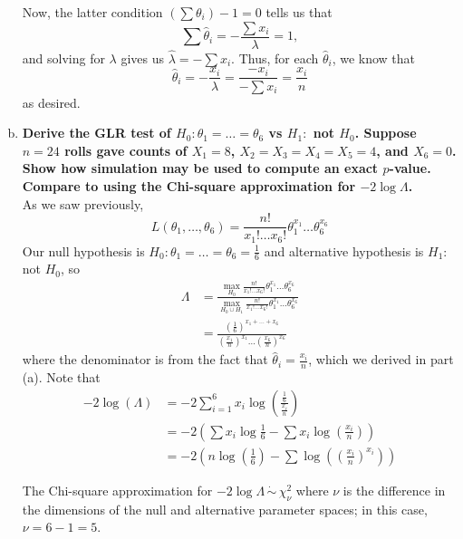 \begin{enumerate}[a)]
    Now, the latter condition $\left(\sum \theta_i \right) - 1 = 0$ tells us that
    \[
        \sum \hat{\theta}_i = - \frac{\sum x_i}{\lambda} = 1,
    \]
    and solving for $\lambda$ gives us $\hat{\lambda} = - \sum x_i$. Thus, for each $\hat{\theta}_i$, we know that
    \[
        \hat{\theta}_i = -\frac{x_i}{\lambda} = \frac{-x_i}{- \sum x_i} = \frac{x_i}{n}
    \]    
    as desired. 

    \item \textbf{Derive the GLR test of $H_0 \colon \theta_1 = \dots = \theta_6$ vs $H_1 \colon$ not $H_0$. Suppose $n=24$ rolls gave counts of $X_1 = 8$, $X_2 = X_3 = X_4 = X_5 = 4$, and $X_6 =0$. Show how simulation may be used to compute an exact $p$-value. Compare to using the Chi-square approximation for $-2\log \Lambda$.} \\
    
     As we saw previously, 
    \[
        L(\theta_1, \dots, \theta_6) = \frac{n!}{x_1! \dots x_6!}\theta_1^{x_1} \dots \theta_6^{x_6}
    \]
    Our null hypothesis is $H_0\colon \theta_1 = \dots = \theta_6 = \frac{1}{6}$ and alternative hypothesis is $H_1\colon$ not $H_0$, so
    \begin{align*}
        \Lambda &= \frac{\max\limits_{H_0} \frac{n!}{x_1! \dots x_6!}\theta_1^{x_1} \dots \theta_6^{x_6}}{\max\limits_{H_0 \cup H_1} \frac{n!}{x_1! \dots x_6!}\theta_1^{x_1} \dots \theta_6^{x_6}} \\
        &= \frac{\left( \frac{1}{6} \right)^{x_1 + \dots + x_6} }{\left( \frac{x_1}{n} \right)^{x_1} \dots \left( \frac{x_6}{n} \right)^{x_6} }
    \end{align*}
    where the denominator is from the fact that $\hat{\theta}_i = \frac{x_i}{n}$, which we derived in part (a). Note that
    \begin{align*}
        -2 \log (\Lambda) &= -2 \sum_{i=1}^6 x_i \log \left( \frac{\frac{1}{6}}{\frac{x_i}{n}} \right) \\
        &= -2 \left( \sum x_i \log \frac{1}{6} - \sum x_i \log \left( \frac{x_i}{n} \right) \right) \\
        &= -2 \left( n \log \left(\frac{1}{6}\right) - \sum \log \left( \left( \frac{x_i}{n} \right)^{x_i} \right) \right) 
    \end{align*}

    The Chi-square approximation for $-2 \log \Lambda \, \dot\sim \, \chi^2_{\nu}$ where $\nu$ is the difference in the dimensions of the null and alternative parameter spaces; in this case, $\nu = 6 - 1 = 5$. \\


\end{enumerate}
